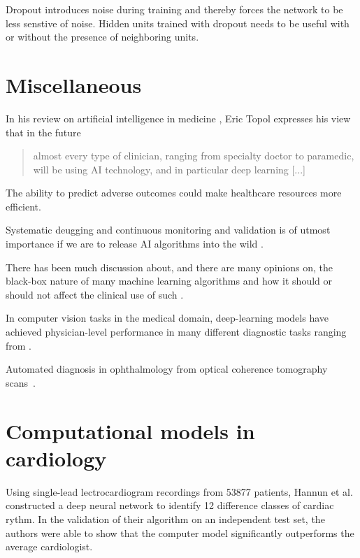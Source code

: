 Dropout introduces noise during training
and thereby forces the network to be less senstive of noise.
Hidden units trained with dropout needs to be useful 
with or without the presence of neighboring units.


\section{Miscellaneous}

In his review on artificial intelligence in medicine%
\autocite{topolHighperformance2019}, 
Eric Topol expresses his view that in the future
\blockquote{%
almost every type of clinician, ranging from specialty doctor to paramedic,
will be using AI technology, and in particular deep learning [...]
}.

The ability to predict adverse outcomes could make  
healthcare resources more efficient.

Systematic deugging and continuous monitoring and validation 
is of utmost importance if we are to release AI algorithms into the wild%
\autocite{topolHighperformance2019}.

There has been much discussion about, and there are many opinions on, 
the black-box nature of many machine learning algorithms and 
how it should or should not affect the clinical use of such 
\autocite{topolHighperformance2019, gunningXAI2019, vanderveldenExplainable2022}.

In computer vision tasks in the medical domain,
deep-learning models have achieved physician-level performance
in many different diagnostic tasks
ranging from .

Automated diagnosis in ophthalmology 
from optical coherence tomography scans~\autocite{defauwClinically2018}.

\section{Computational models in cardiology}

Using single-lead lectrocardiogram recordings from \num{53877} patients,
Hannun et al.\autocite{hannunCardiologistlevel2019}
constructed a deep neural network
to identify 12 difference classes of cardiac rythm.
In the validation of their algorithm on an independent test set,
the authors were able to show that the computer model
significantly outperforms the average cardiologist. 


